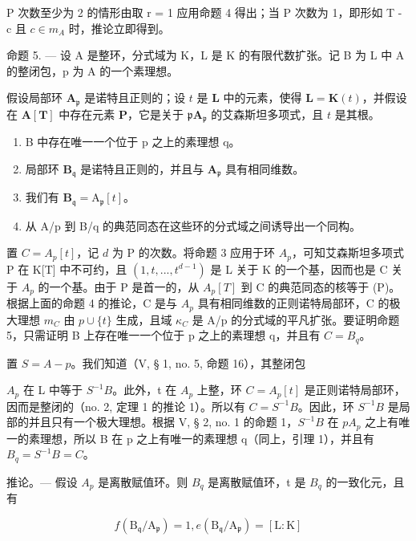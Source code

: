 P 次数至少为 2 的情形由取 r = 1 应用命题 4 得出；当 P 次数为 1，即形如 T - c 且 \(c \in m_{A}\) 时，推论立即得到。

命题 5. --- 设 A 是整环，分式域为 K，L 是 K 的有限代数扩张。记 B 为 L 中 A 的整闭包，p 为 A 的一个素理想。

假设局部环 \(\mathbf{A}_{\mathfrak{p}}\) 是诺特且正则的；设 \(t\) 是 \(\mathbf{L}\) 中的元素，使得 \(\mathbf{L} = \mathbf{K}(t)\)，并假设在 \(\mathbf{A}[\mathbf{T}]\) 中存在元素 \(\mathbf{P}\)，它是关于 \(\mathfrak{p}\mathbf{A}_{\mathfrak{p}}\) 的艾森斯坦多项式，且 \(t\) 是其根。

\begin{enumerate}
\def\labelenumi{\alph{enumi})}
\item
  B 中存在唯一一个位于 p 之上的素理想 q。
\item
  局部环 \(\mathbf{B}_{\mathfrak{q}}\) 是诺特且正则的，并且与 \(\mathbf{A}_{\mathfrak{p}}\) 具有相同维数。
\item
  我们有 \(\mathbf{B}_{\mathfrak{q}} = \mathrm{A}_{\mathfrak{p}}[t]\)。
\item
  从 A/p 到 B/q 的典范同态在这些环的分式域之间诱导出一个同构。
\end{enumerate}

置 \(C = A_{p}[t]\)，记 \(d\) 为 P 的次数。将命题 3 应用于环 \(A_{p}\)，可知艾森斯坦多项式 P 在 K{[}T{]} 中不可约，且 \((1, t, ..., t^{d-1})\) 是 L 关于 K 的一个基，因而也是 C 关于 \(A_{p}\) 的一个基。由于 P 是首一的，从 \(A_{p}[T]\) 到 C 的典范同态的核等于 (P)。根据上面的命题 4 的推论，C 是与 \(A_{p}\) 具有相同维数的正则诺特局部环，C 的极大理想 \(m_{C}\) 由 \(p \cup \{t\}\) 生成，且域 \(\kappa_{C}\) 是 A/p 的分式域的平凡扩张。要证明命题 5，只需证明 B 上存在唯一一个位于 p 之上的素理想 q，并且有 \(C = B_{q}\)。

置 \(S = A - p\)。我们知道（V, § 1, no. 5, 命题 16），其整闭包

\(A_{p}\) 在 L 中等于 \(S^{-1}B\)。此外，t 在 \(A_{p}\) 上整，环 \(C = A_{p}[t]\) 是正则诺特局部环，因而是整闭的（no. 2, 定理 1 的推论 1）。所以有 \(C = S^{-1}B\)。因此，环 \(S^{-1}B\) 是局部的并且只有一个极大理想。根据 V, § 2, no. 1 的命题 1，\(S^{-1}B\) 在 \(pA_{p}\) 之上有唯一的素理想，所以 B 在 p 之上有唯一的素理想 q（同上，引理 1），并且有 \(B_{q} = S^{-1}B = C\)。

推论。--- 假设 \(A_{p}\) 是离散赋值环。则 \(B_{q}\) 是离散赋值环，t 是 \(B_{q}\) 的一致化元，且有

\[
f (\mathrm{B} _ {\mathfrak {q}} / \mathrm{A} _ {\mathfrak {p}}) = 1, e (\mathrm{B} _ {\mathfrak {q}} / \mathrm{A} _ {\mathfrak {p}}) = [ \mathrm{L}: \mathrm{K} ]\tag{9}
\]

